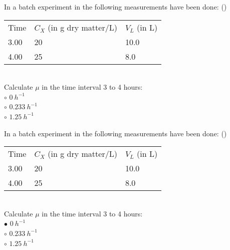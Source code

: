 \documentclass[]{beamer}
\begin{document}
\begin{frame}[shrink] {}
\color{blue}
In a batch experiment in the following measurements have been done:
({\color{green}{Q8}})\\
\color{gray}
\begin{tabular}[ ]{l l l}
Time & $C_{X}$ (in g dry matter/L) & $V_{L}$ (in L)  \\
3.00 & 20 & 10.0  \\
4.00 & 25 & 8.0  \\
\end{tabular}  \\
\color{blue}
Calculate $\mu$ in the time interval 3 to 4 hours:
\\
\color{black}
\setlength{\parindent}{-0.4cm}
{\color{red}$\circ$} $0 ~h^{-1}$  \\
{\color{red}$\circ$} $0.233 ~h^{-1}$  \\
{\color{red}$\circ$} $1.25 ~h^{-1}$  \\
\end{frame}
\begin{frame}[shrink] {}
\color{blue}
In a batch experiment in the following measurements have been done:
({\color{green}{Q8}})\\
\color{gray}
\begin{tabular}[ ]{l l l}
Time & $C_{X}$ (in g dry matter/L) & $V_{L}$ (in L)  \\
3.00 & 20 & 10.0  \\
4.00 & 25 & 8.0  \\
\end{tabular}  \\
\color{blue}
Calculate $\mu$ in the time interval 3 to 4 hours:
\\
\color{black}
\setlength{\parindent}{-0.4cm}
{\color{red}$\bullet$} $0 ~h^{-1}$  \\
{\color{red}$\circ$} $0.233 ~h^{-1}$  \\
{\color{red}$\circ$} $1.25 ~h^{-1}$  \\
\end{frame}
\end{document}
